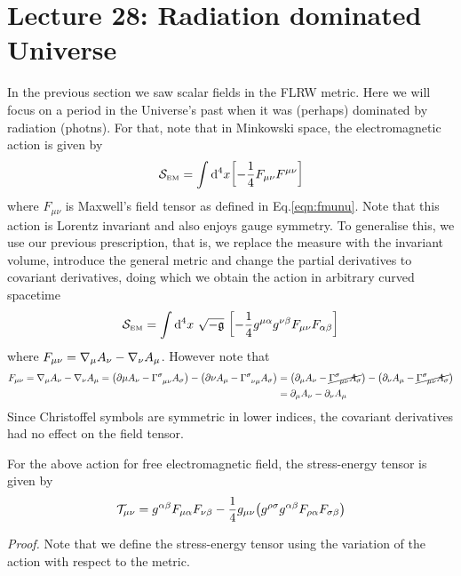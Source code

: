 \section*{Lecture 28: Radiation dominated Universe}
In the previous section we saw scalar fields in the FLRW metric. Here we will focus on a period in the Universe's past when it was (perhaps) dominated by radiation (photns). For that, note that in Minkowski space, the electromagnetic action is given by  
\begin{align*}
    \mathcal S_{\text{\tiny EM}} = \int \dd^4 x \qty[-\frac{1}{4}F_{\mu\nu}F^{\mu\nu}]
\end{align*}
where $F_{\mu\nu}$ is Maxwell's field tensor as defined in Eq.\ref{eqn:fmunu}. Note that this action is Lorentz invariant and also enjoys gauge symmetry. To generalise this, we use our previous prescription, that is, we replace the measure with the invariant volume, introduce the general metric and change the partial derivatives to covariant derivatives, doing which we obtain the action in arbitrary curved spacetime
\begin{align}\label{eqn:elecaction}
    \Ss\tund{EM} = \int \dd^4 x \ \detm\  \qty[-\frac{1}{4}g^{\mu\alpha}g^{\nu \beta}F_{\mu\nu}F_{\alpha\beta}]
\end{align}
where $F_{\mu\nu} = \nabla_{\mu}A_\nu - \nabla_{\nu}A_{\mu}$. However note that 
\begin{align*}
    F_{\mu\nu} = \covd{\mu}A_\nu - \covd{\nu}A_{\mu}=\qty(\partial\mu A_\nu - \chris{\sigma}{\mu}{\nu}A_{\sigma}) - \qty(\partial\nu A_\mu - \chris{\sigma}{\nu}{\mu}A_{\sigma})&=\qty(\partial_\mu A_\nu - \cancel{\chris{\sigma}{\mu}{\nu}A_{\sigma}}) - \qty(\partial_\nu A_\mu -\cancel{ \chris{\sigma}{\mu}{\nu}A_{\sigma}})\\
     &=\partial_\mu A_\nu - \partial_\nu A_\mu 
\end{align*}
Since Christoffel symbols are symmetric in lower indices, the covariant derivatives had no effect on the field tensor. 
\begin{tcolorbox}[colframe=black, colback=lime!20!white, boxrule=1.5pt, arc=4pt]
    For the above action for free electromagnetic field, the stress-energy tensor is given by 
    $$\mathcal T_{\mu\nu} = g^{\alpha\beta}F_{\mu\alpha}F_{\nu\beta} - \frac{1}{4}g_{\mu\nu} \qty(g^{\rho\sigma}g^{\alpha\beta} F_{\rho\alpha}F_{\sigma\beta})$$
\end{tcolorbox}
\noindent
\textit{Proof.} Note that we define the stress-energy tensor using the variation of the action with respect to the metric.  
